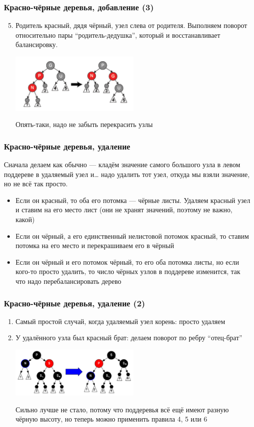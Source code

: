 \documentclass[xetex,mathserif,serif]{beamer}
\begin{document}
	\begin{frame}
		\frametitle{Красно-чёрные деревья, добавление (3)}
		\begin{enumerate}
			\setcounter{enumi}{4}
			\item Родитель красный, дядя чёрный, узел слева от родителя. Выполняем поворот относительно пары ``родитель-дедушка'', который и восстанавливает балансировку.
			\begin{center}
				\includegraphics[width=0.5\textwidth]{addition-to-red-black-tree3.png}
			\end{center}
			Опять-таки, надо не забыть перекрасить узлы
		\end{enumerate}
	\end{frame}

	\begin{frame}
		\frametitle{Красно-чёрные деревья, удаление}
		Сначала делаем как обычно --- кладём значение самого большого узла в левом поддереве в удаляемый узел и… надо удалить тот узел, откуда мы взяли значение, но не всё так просто.
		\begin{itemize}
			\item Если он красный, то оба его потомка --- чёрные листы. Удаляем красный узел и ставим на его место лист (они не хранят значений, поэтому не важно, какой)
			\item Если он чёрный, а его единственный нелистовой потомок красный, то ставим потомка на его место и перекрашиваем его в чёрный
			\item Если он чёрный и его потомок чёрный, то его оба потомка листы, но если кого-то просто удалить, то число чёрных узлов в поддереве изменится, так что надо перебалансировать дерево
		\end{itemize}
	\end{frame}

	\begin{frame}
		\frametitle{Красно-чёрные деревья, удаление (2)}
		\begin{enumerate}
			\item Самый простой случай, когда удаляемый узел корень: просто удаляем
			\item У удалённого узла был красный брат: делаем поворот по ребру ``отец-брат''
			\begin{center}
				\includegraphics[width=0.5\textwidth]{deletion-from-red-black-tree.png}
			\end{center}
			Сильно лучше не стало, потому что поддеревья всё ещё имеют разную чёрную высоту, но теперь можно применить правила 4, 5 или 6
		\end{enumerate}
	\end{frame}
\end{document}
